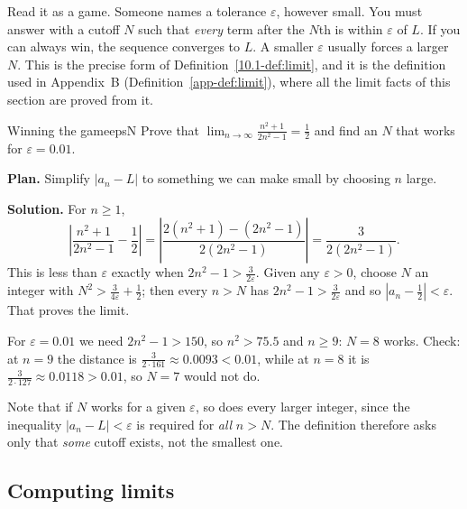 \documentclass[11pt]{article}
\begin{document}
Read it as a game. Someone names a tolerance $\varepsilon$, however small. You must answer with a cutoff $N$ such that \emph{every} term after the $N$th is within $\varepsilon$ of $L$. If you can always win, the sequence converges to $L$. A smaller $\varepsilon$ usually forces a larger $N$. This is the precise form of Definition~\ref{10.1-def:limit}, and it is the definition used in Appendix~B (Definition~\ref{app-def:limit}), where all the limit facts of this section are proved from it.

\begin{exmp}{Winning the game}{epsN}
Prove that $\displaystyle\lim_{n\to\infty}\frac{n^2+1}{2n^2-1}=\frac12$ and find an $N$ that works for $\varepsilon=0.01$.

\textbf{Plan.} Simplify $|a_n-L|$ to something we can make small by choosing $n$ large.

\textbf{Solution.} For $n\ge1$,
\[
\left|\frac{n^2+1}{2n^2-1}-\frac12\right|=\left|\frac{2(n^2+1)-(2n^2-1)}{2(2n^2-1)}\right|=\frac{3}{2(2n^2-1)} .
\]
This is less than $\varepsilon$ exactly when $2n^2-1>\frac3{2\varepsilon}$. Given any $\varepsilon>0$, choose $N$ an integer with $N^2>\frac{3}{4\varepsilon}+\frac12$; then every $n>N$ has $2n^2-1>\frac3{2\varepsilon}$ and so $|a_n-\frac12|<\varepsilon$. That proves the limit.

For $\varepsilon=0.01$ we need $2n^2-1>150$, so $n^2>75.5$ and $n\ge9$: $N=8$ works. Check: at $n=9$ the distance is $\frac3{2\cdot161}\approx0.0093<0.01$, while at $n=8$ it is $\frac3{2\cdot127}\approx0.0118>0.01$, so $N=7$ would not do.
\end{exmp}

Note that if $N$ works for a given $\varepsilon$, so does every larger integer, since the inequality $|a_n-L|<\varepsilon$ is required for \emph{all} $n>N$. The definition therefore asks only that \emph{some} cutoff exists, not the smallest one.

\subsection*{Computing limits}
\end{document}
